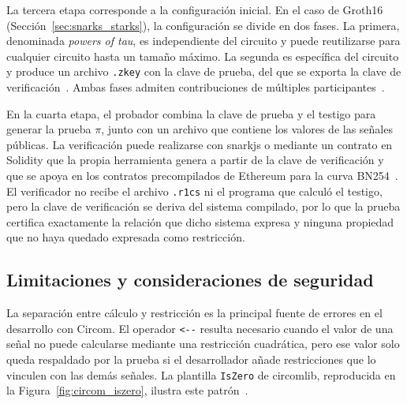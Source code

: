 La tercera etapa corresponde a la configuración inicial. En el caso de Groth16
(Sección~\ref{sec:snarks_starks}), la configuración se divide en dos fases. La primera,
denominada \textit{powers of tau}, es independiente del circuito y puede reutilizarse para
cualquier circuito hasta un tamaño máximo. La segunda es específica del circuito y produce un
archivo \texttt{.zkey} con la clave de prueba, del que se exporta la clave de
verificación~\cite{circomdocs}. Ambas fases admiten contribuciones de múltiples
participantes~\cite{bowe2017scalable}.

En la cuarta etapa, el probador combina la clave de prueba y el testigo para generar la prueba
$\pi$, junto con un archivo que contiene los valores de las señales públicas. La verificación
puede realizarse con snarkjs o mediante un contrato en Solidity que la propia herramienta genera
a partir de la clave de verificación y que se apoya en los contratos precompilados de Ethereum
para la curva BN254~\cite{snarkjs, eip196, eip197}. El verificador no recibe el archivo
\texttt{.r1cs} ni el programa que calculó el testigo, pero la clave de verificación se deriva del
sistema compilado, por lo que la prueba certifica exactamente la relación que dicho sistema
expresa y ninguna propiedad que no haya quedado expresada como restricción.

\subsection{Limitaciones y consideraciones de seguridad}
\label{sec:circom_limitaciones}

La separación entre cálculo y restricción es la principal fuente de errores en el desarrollo con
Circom. El operador \lstinline|<--| resulta necesario cuando el valor de una señal no puede
calcularse mediante una restricción cuadrática, pero ese valor solo queda respaldado por la
prueba si el desarrollador añade restricciones que lo vinculen con las demás señales. La
plantilla \texttt{IsZero} de circomlib, reproducida en la Figura~\ref{fig:circom_iszero}, ilustra
este patrón~\cite{circomlib}.

